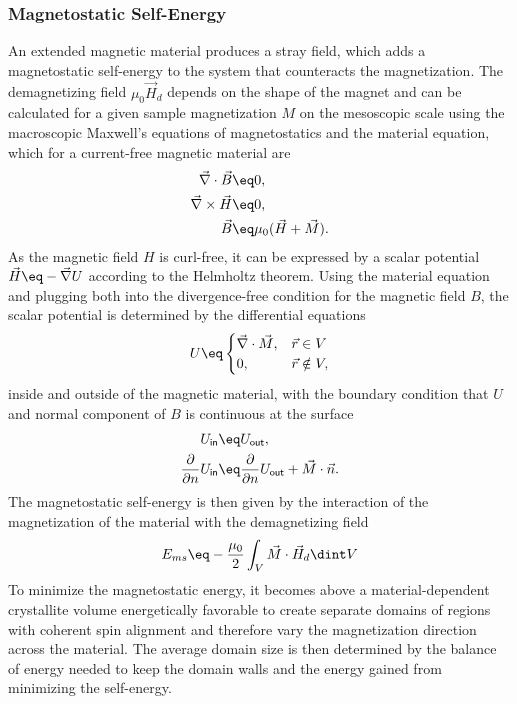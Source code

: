 \documentclass[\main/dresen_thesis.tex]{subfiles}
\begin{document}
    \subsubsection{Magnetostatic Self-Energy}
      An extended magnetic material produces a stray field, which adds a magnetostatic self-energy to the system that counteracts the magnetization.
      The demagnetizing field $\mu_0 \vec{H}_d$ depends on the shape of the magnet and can be calculated for a given sample magnetization $M$ on the mesoscopic scale using the macroscopic Maxwell's equations of magnetostatics and the material equation, which for a current-free magnetic material are \cite{Jackson_1999_Class}
      \begin{align}
        \vec{\nabla} \cdot \vec{B} \eq& 0,\\
        \vec{\nabla} \times \vec{H} \eq& 0,\\
        \vec{B} \eq& \mu_0 (\vec{H} + \vec{M}).
      \end{align}
      As the magnetic field $H$ is curl-free, it can be expressed by a scalar potential $\vec{H} \eq -\vec{\nabla} U$ according to the Helmholtz theorem.
      Using the material equation and plugging both into the divergence-free condition for the magnetic field $B$, the scalar potential is determined by the differential equations
      \begin{align}
        U \eq \begin{cases}
          \vec{\nabla} \cdot \vec{M}, & \vec{r} \in V \\
          0, &\vec{r} \notin V,
      \end{cases}
      \end{align}
      inside and outside of the magnetic material, with the boundary condition that $U$ and normal component of $B$ is continuous at the surface
      \begin{align}
        U_\mathsf{in} &\eq U_\mathsf{out},\\
        \frac{\partial}{\partial n} U_\mathsf{in} &\eq \frac{\partial}{\partial n} U_\mathsf{out} + \vec{M} \cdot \vec{n}.\\
      \end{align}
      The magnetostatic self-energy is then given by the interaction of the magnetization of the material with the demagnetizing field
      \begin{align}
        E_{ms} \eq -\frac{\mu_0}{2} \int_V \vec{M} \cdot \vec{H}_d \dint V
      \end{align}
      To minimize the magnetostatic energy, it becomes above a material-dependent crystallite volume energetically favorable to create separate domains of regions with coherent spin alignment and therefore vary the magnetization direction across the material.
      The average domain size is then determined by the balance of energy needed to keep the domain walls and the energy gained from minimizing the self-energy.
\end{document}
